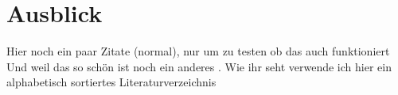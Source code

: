 \chapter{Ausblick}

Hier noch ein paar Zitate \cite{einstein} (normal), nur um zu testen ob das auch funktioniert \cite{dirac} \citet{NoSQL}\\

Und weil das so schön ist noch ein anderes \cite{knuthwebsite}.
Wie ihr seht verwende ich hier ein alphabetisch sortiertes Literaturverzeichnis